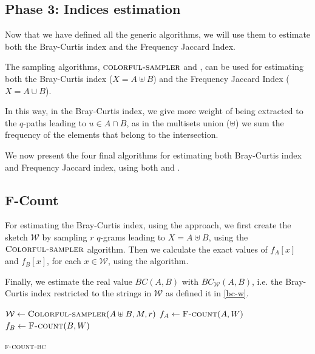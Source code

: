 \clearpage

\subsection*{Phase 3: Indices estimation}

Now that we have defined all the generic algorithms, we will use them to estimate both the Bray-Curtis index and the Frequency Jaccard Index.\medskip

The sampling algorithms, $\textsc{colorful-sampler}$ and \fsamp, can be used for estimating both the Bray-Curtis index ($X = A \uplus B$) and the Frequency Jaccard Index ($X = A \cup B$).

In this way, in the Bray-Curtis index, we give more weight of being extracted to the $q$-paths leading to $u \in A \cap B$, as in the multisets union ($\uplus$) we sum the frequency of the elements that belong to the intersection.\medskip

We now present the four final algorithms for estimating both Bray-Curtis index and Frequency Jaccard index, using both \fcount and \fsamp.

\subsection*{F-Count}

For estimating the Bray-Curtis index, using the \fcount approach, we first create the sketch $\mathcal{W}$ by sampling $r$ $q$-grams leading to $X = A \uplus B$, using the $\textsc{Colorful-sampler}$ algorithm. Then we calculate the exact values of $f_{A}[x]$ and $f_{B}[x]$, for each $x \in \mathcal{W}$, using the \fcount algorithm.

Finally, we estimate the real value $BC(A,B)$ with $BC_{ \mathcal{W} }(A,B)$, i.e. the Bray-Curtis index restricted to the strings in $\mathcal{W}$ as defined it in \eqref{bc-w}.

\begin{algorithm}[h]
	\small
	\DontPrintSemicolon
	\BlankLine
	$\mathcal{W} \gets \textsc{Colorful-sampler}(A \uplus B, M, r)$ \;
	$f_{A} \gets \textsc{F-count}(A, W)$ \;
	$f_{B} \gets \textsc{F-count}(B, W)$ \;
	\BlankLine
	\caption{\textsc{f-count-bc}}
	\label{alg:f-count-bc}
\end{algorithm}


